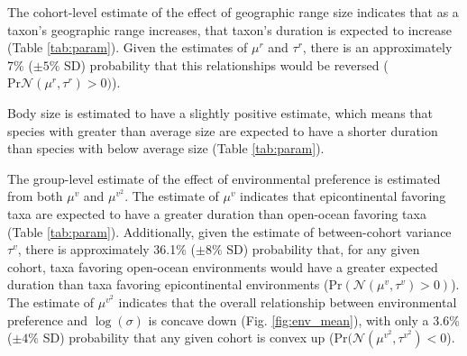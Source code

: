 \documentclass[11pt]{article}
\begin{document}
The cohort-level estimate of the effect of geographic range size indicates that as a taxon's geographic range increases, that taxon's duration is expected to increase (Table \ref{tab:param}). Given the estimates of \(\mu^{r}\) and \(\tau^{r}\), there is an approximately 7\% (\(\pm 5\%\) SD) probability that this relationships would be reversed (\(\mathrm{Pr}\mathcal{N}(\mu^{r}, \tau^{r}) > 0)\)). 

Body size is estimated to have a slightly positive estimate, which means that species with greater than average size are expected to have a shorter duration than species with below average size (Table \ref{tab:param}).

The group-level estimate of the effect of environmental preference is estimated from both \(\mu^{v}\) and \(\mu^{v^{2}}\). The estimate of \(\mu^{v}\) indicates that epicontinental favoring taxa are expected to have a greater duration than open-ocean favoring taxa (Table \ref{tab:param}). Additionally, given the estimate of between-cohort variance \(\tau^{v}\), there is approximately 36.1\% (\(\pm 8\%\) SD) probability that, for any given cohort, taxa favoring open-ocean environments would have a greater expected duration than taxa favoring epicontinental environments (\(\mathrm{Pr}(\mathcal{N}(\mu^{v}, \tau^{v}) > 0)\)). The estimate of \(\mu^{v^{2}}\) indicates that the overall relationship between environmental preference and \(\log(\sigma)\) is concave down (Fig. \ref{fig:env_mean}), with only a 3.6\% (\(\pm 4\%\) SD) probability that any given cohort is convex up (\(\mathrm{Pr}(\mathcal{N}(\mu^{v^{2}}, \tau^{v^{2}}) < 0\)).
\end{document}
